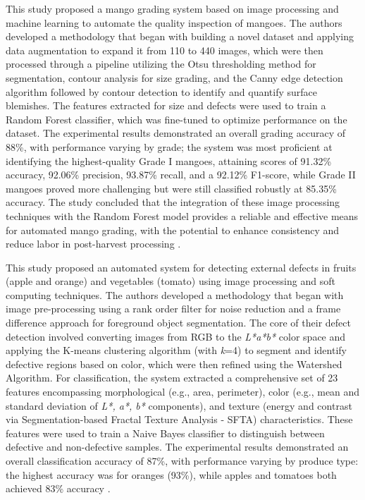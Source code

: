 {
This study proposed a mango grading system based on image processing and machine learning to automate the quality inspection of mangoes. The authors developed a methodology that began with building a novel dataset and applying data augmentation to expand it from 110 to 440 images, which were then processed through a pipeline utilizing the Otsu thresholding method for segmentation, contour analysis for size grading, and the Canny edge detection algorithm followed by contour detection to identify and quantify surface blemishes. The features extracted for size and defects were used to train a Random Forest classifier, which was fine-tuned to optimize performance on the dataset. The experimental results demonstrated an overall grading accuracy of 88\%, with performance varying by grade; the system was most proficient at identifying the highest-quality Grade I mangoes, attaining scores of 91.32\% accuracy, 92.06\% precision, 93.87\% recall, and a 92.12\% F1-score, while Grade II mangoes proved more challenging but were still classified robustly at 85.35\% accuracy. The study concluded that the integration of these image processing techniques with the Random Forest model provides a reliable and effective means for automated mango grading, with the potential to enhance consistency and reduce labor in post-harvest processing \citep{Doan2023}.


This study proposed an automated system for detecting external defects in fruits (apple and orange) and vegetables (tomato) using image processing and soft computing techniques. The authors developed a methodology that began with image pre-processing using a rank order filter for noise reduction and a frame difference approach for foreground object segmentation. The core of their defect detection involved converting images from RGB to the \textit{L*a*b*} color space and applying the K-means clustering algorithm (with \textit{k}=4) to segment and identify defective regions based on color, which were then refined using the Watershed Algorithm. For classification, the system extracted a comprehensive set of 23 features encompassing morphological (e.g., area, perimeter), color (e.g., mean and standard deviation of \textit{L*, a*, b*} components), and texture (energy and contrast via Segmentation-based Fractal Texture Analysis - SFTA) characteristics. These features were used to train a Naive Bayes classifier to distinguish between defective and non-defective samples. The experimental results demonstrated an overall classification accuracy of 87\%, with performance varying by produce type: the highest accuracy was for oranges (93\%), while apples and tomatoes both achieved 83\% accuracy \citep{Narendra2021}.

}
